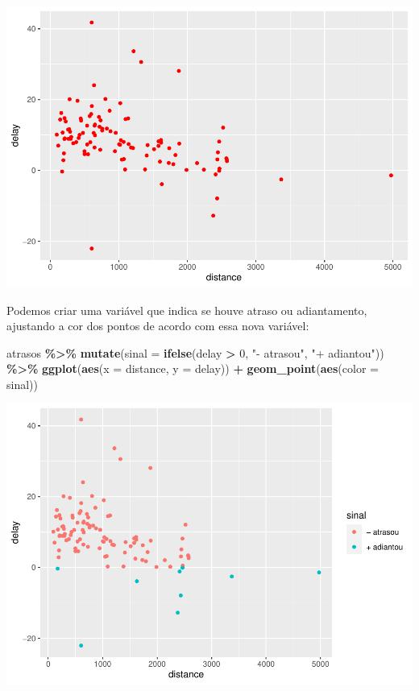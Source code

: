 \documentclass[
]{book}
\newenvironment{Shaded}{\begin{snugshade}}{\end{snugshade}}
\newcommand{\AttributeTok}[1]{\textcolor[rgb]{0.13,0.29,0.53}{#1}}
\newcommand{\DecValTok}[1]{\textcolor[rgb]{0.00,0.00,0.81}{#1}}
\newcommand{\FunctionTok}[1]{\textcolor[rgb]{0.13,0.29,0.53}{\textbf{#1}}}
\newcommand{\NormalTok}[1]{#1}
\newcommand{\SpecialCharTok}[1]{\textcolor[rgb]{0.81,0.36,0.00}{\textbf{#1}}}
\newcommand{\StringTok}[1]{\textcolor[rgb]{0.31,0.60,0.02}{#1}}
\begin{document}
\includegraphics{AprendendoR_files/figure-latex/unnamed-chunk-59-1.pdf}

Podemos criar uma variável que indica se houve atraso ou adiantamento, ajustando a cor dos pontos de acordo com essa nova variável:

\begin{Shaded}
\begin{Highlighting}[]
\NormalTok{atrasos }\SpecialCharTok{\%\textgreater{}\%} 
  \FunctionTok{mutate}\NormalTok{(}\AttributeTok{sinal =} \FunctionTok{ifelse}\NormalTok{(delay }\SpecialCharTok{\textgreater{}} \DecValTok{0}\NormalTok{, }\StringTok{"{-} atrasou"}\NormalTok{, }\StringTok{"+ adiantou"}\NormalTok{)) }\SpecialCharTok{\%\textgreater{}\%}
  \FunctionTok{ggplot}\NormalTok{(}\FunctionTok{aes}\NormalTok{(}\AttributeTok{x =}\NormalTok{ distance, }\AttributeTok{y =}\NormalTok{ delay)) }\SpecialCharTok{+}
  \FunctionTok{geom\_point}\NormalTok{(}\FunctionTok{aes}\NormalTok{(}\AttributeTok{color =}\NormalTok{ sinal))}
\end{Highlighting}
\end{Shaded}

\includegraphics{AprendendoR_files/figure-latex/unnamed-chunk-60-1.pdf}
\end{document}
